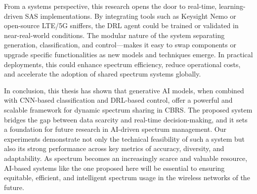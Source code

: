 From a systems perspective, this research opens the door to real-time, learning-driven SAS implementations. By integrating tools such as Keysight Nemo or open-source LTE/5G sniffers, the DRL agent could be trained or validated in near-real-world conditions. The modular nature of the system separating generation, classification, and control—makes it easy to swap components or upgrade specific functionalities as new models and techniques emerge. In practical deployments, this could enhance spectrum efficiency, reduce operational costs, and accelerate the adoption of shared spectrum systems globally.

In conclusion, this thesis has shown that generative AI models, when combined with CNN-based classification and DRL-based control, offer a powerful and scalable framework for dynamic spectrum sharing in CBRS. The proposed system bridges the gap between data scarcity and real-time decision-making, and it sets a foundation for future research in AI-driven spectrum management. Our experiments demonstrate not only the technical feasibility of such a system but also its strong performance across key metrics of accuracy, diversity, and adaptability. As spectrum becomes an increasingly scarce and valuable resource, AI-based systems like the one proposed here will be essential to ensuring equitable, efficient, and intelligent spectrum usage in the wireless networks of the future.